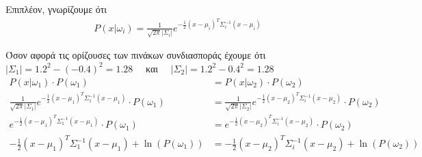 \documentclass{article}
\begin{document}
	\noindent
	Eπιπλέον, γνωρίζουμε ότι 
	\begin{align*}
		P(x | ω_{i}) = \frac{1}{\sqrt{2π} |Σ_{i}|} e^{-\frac{1}{2}(x - μ_{i})^{T} Σ_{i}^{-1} (x - μ_{i})}
	\end{align*}
	
	\noindent
	Όσον αφορά τις ορίζουσες των πινάκων συνδιασποράς έχουμε ότι \\
	$|Σ_{1}| = 1.2^2 - (-0.4)^2 = 1.28$ \ \ και \ \ $|Σ_{2}| = 1.2^2 - 0.4^2 = 1.28$\\
	
	\begin{align*}
		P(x | ω_{1}) \cdot P(ω_{1}) &= P(x | ω_{2}) \cdot P(ω_{2}) \\
		\frac{1}{\sqrt{2π} |Σ_{1}|} e^{-\frac{1}{2}(x - μ_{1})^{T} Σ_{1}^{-1} (x - μ_{1})} \cdot P(ω_{1}) &= 
		\frac{1}{\sqrt{2π} |Σ_{2}|} e^{-\frac{1}{2}(x - μ_{2})^{T} Σ_{i}^{-1} (x - μ_{2})} \cdot P(ω_{2}) \\
		e^{-\frac{1}{2}(x - μ_{1})^{T} Σ_{1}^{-1} (x - μ_{1})} \cdot P(ω_{1}) &= 
		e^{-\frac{1}{2}(x - μ_{2})^{T} Σ_{i}^{-1} (x - μ_{2})} \cdot P(ω_{2}) \\
		-\frac{1}{2}(x - μ_{1})^{T} Σ_{1}^{-1} (x - μ_{1}) + \ln (P(ω_{1})) &= 
		-\frac{1}{2}(x - μ_{2})^{T} Σ_{i}^{-1} (x - μ_{2}) + \ln (P(ω_{2})) 
	\end{align*}
\end{document}
